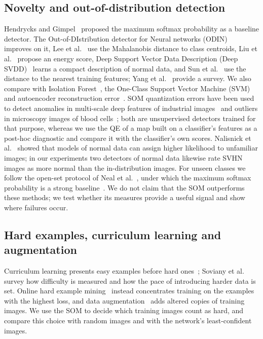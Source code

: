 \documentclass[preprint,review,12pt]{elsarticle}
\begin{document}
\subsection{Novelty and out-of-distribution detection}
Hendrycks and Gimpel~\cite{hendrycks2017baseline} proposed the maximum softmax probability as a baseline detector. The Out-of-DIstribution detector for Neural networks (ODIN)~\cite{liang2018odin} improves on it, Lee et al.~\cite{lee2018mahalanobis} use the Mahalanobis distance to class centroids, Liu et al.~\cite{liu2020energy} propose an energy score, Deep Support Vector Data Description (Deep SVDD)~\cite{ruff2018deep} learns a compact description of normal data, and Sun et al.~\cite{sun2022knn} use the distance to the nearest training features; Yang et al.~\cite{yang2024generalized} provide a survey. We also compare with Isolation Forest~\cite{liu2008isolation}, the One-Class Support Vector Machine (SVM)~\cite{scholkopf2001support} and autoencoder reconstruction error~\cite{sakurada2014autoencoder}. SOM quantization errors have been used to detect anomalies in multi-scale deep features of industrial images~\cite{li2021somad} and outliers in microscopy images of blood cells~\cite{rohrl2022outlier}; both are unsupervised detectors trained for that purpose, whereas we use the QE of a map built on a classifier's features as a post-hoc diagnostic and compare it with the classifier's own scores. Nalisnick et al.~\cite{nalisnick2019deep} showed that models of normal data can assign higher likelihood to unfamiliar images; in our experiments two detectors of normal data likewise rate SVHN images as more normal than the in-distribution images. For unseen classes we follow the open-set protocol of Neal et al.~\cite{neal2018open}, under which the maximum softmax probability is a strong baseline~\cite{vaze2022openset}. We do not claim that the SOM outperforms these methods; we test whether its measures provide a useful signal and show where failures occur.

\subsection{Hard examples, curriculum learning and augmentation}
Curriculum learning presents easy examples before hard ones~\cite{bengio2009curriculum}; Soviany et al.~\cite{soviany2022curriculum} survey how difficulty is measured and how the pace of introducing harder data is set. Online hard example mining~\cite{shrivastava2016ohem} instead concentrates training on the examples with the highest loss, and data augmentation~\cite{shorten2019augmentation} adds altered copies of training images. We use the SOM to decide which training images count as hard, and compare this choice with random images and with the network's least-confident images.
\end{document}
